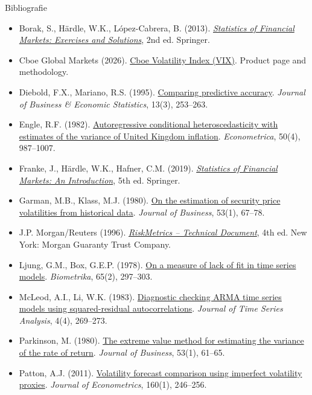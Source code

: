 \begin{frame}{Bibliografie}
\itemsize{\tiny}
\begin{itemize}
    \item Borak, S., Härdle, W.K., López-Cabrera, B. (2013). \href{https://doi.org/10.1007/978-3-642-33929-5}{\textit{Statistics of Financial Markets: Exercises and Solutions}}, 2nd ed. Springer.
    \item Cboe Global Markets (2026). \href{https://www.cboe.com/tradable_products/vix/}{Cboe Volatility Index (VIX)}. Product page and methodology.
    \item Diebold, F.X., Mariano, R.S. (1995). \href{https://doi.org/10.1080/07350015.1995.10524599}{Comparing predictive accuracy}. \textit{Journal of Business \& Economic Statistics}, 13(3), 253--263.
    \item Engle, R.F. (1982). \href{https://doi.org/10.2307/1912773}{Autoregressive conditional heteroscedasticity with estimates of the variance of United Kingdom inflation}. \textit{Econometrica}, 50(4), 987--1007.
    \item Franke, J., Härdle, W.K., Hafner, C.M. (2019). \href{https://doi.org/10.1007/978-3-030-13751-9}{\textit{Statistics of Financial Markets: An Introduction}}, 5th ed. Springer.
    \item Garman, M.B., Klass, M.J. (1980). \href{https://doi.org/10.1086/296072}{On the estimation of security price volatilities from historical data}. \textit{Journal of Business}, 53(1), 67--78.
    \item J.P. Morgan/Reuters (1996). \href{https://www.msci.com/documents/10199/5915b101-4206-4ba0-aee2-3449d5c7e95a}{\textit{RiskMetrics -- Technical Document}}, 4th ed. New York: Morgan Guaranty Trust Company.
    \item Ljung, G.M., Box, G.E.P. (1978). \href{https://doi.org/10.1093/biomet/65.2.297}{On a measure of lack of fit in time series models}. \textit{Biometrika}, 65(2), 297--303.
    \item McLeod, A.I., Li, W.K. (1983). \href{https://doi.org/10.1111/j.1467-9892.1983.tb00373.x}{Diagnostic checking ARMA time series models using squared-residual autocorrelations}. \textit{Journal of Time Series Analysis}, 4(4), 269--273.
    \item Parkinson, M. (1980). \href{https://doi.org/10.1086/296071}{The extreme value method for estimating the variance of the rate of return}. \textit{Journal of Business}, 53(1), 61--65.
    \item Patton, A.J. (2011). \href{https://doi.org/10.1016/j.jeconom.2010.03.034}{Volatility forecast comparison using imperfect volatility proxies}. \textit{Journal of Econometrics}, 160(1), 246--256.

\end{itemize}
\end{frame}
